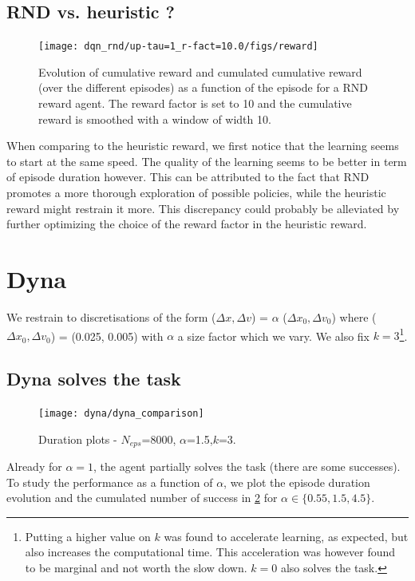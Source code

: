 \documentclass[a4paper, 12pt,oneside]{article}
\begin{document}
        \subsection{RND vs. heuristic ?}
            \begin{figure}
                \centering
                \vspace{-3em}
                \texttt{[image: dqn\_rnd/up-tau=1\_r-fact=10.0/figs/reward]}
            \caption{Evolution of cumulative reward and cumulated cumulative reward (over the different episodes) as a function of the episode for a RND reward agent. The reward factor is set to 10 and the cumulative reward is smoothed with a window of width 10.}
            \label{fig:dqn-rnd-r-fact=35-reward}
            \end{figure}
        When comparing to the heuristic reward, we first notice that the learning seems to start at the same speed. The quality of the learning seems to be better in term of episode duration however. This can be attributed to the fact that RND promotes a more thorough exploration of possible policies, while the heuristic reward might restrain it more. This discrepancy could probably be alleviated by further optimizing the choice of the reward factor in the heuristic reward.
        \section{Dyna}
        We restrain to discretisations of the form ($\Delta x, \Delta v$) = $\alpha$ ($\Delta x_0, \Delta v_0$) where ($\Delta x_0, \Delta v_0$) = (0.025, 0.005) with $\alpha$ a size factor which we vary. We also fix $k=3$\footnote{Putting a higher value on $k$ was found to accelerate learning, as expected, but also increases the computational time. This acceleration was however found to be marginal and not worth the slow down. $k=0$ also solves the task.}. 
        \subsection{Dyna solves the task}
        \begin{figure}
            \centering
            \vspace{-3em}
            \texttt{[image: dyna/dyna\_comparison]}
            \caption{Duration plots - $N_{eps}$=8000, $\alpha$=1.5,$k$=3.  }
            \label{dyna-comparison}
        \end{figure}
        Already for $\alpha=1$, the agent partially solves the task (there are some successes). 
        To study the performance as a function of $\alpha$, we plot the episode duration evolution and the cumulated number of success in \ref{dyna-comparison} for $\alpha\in\{0.55,1.5,4.5\}$. 
        
\end{document}
